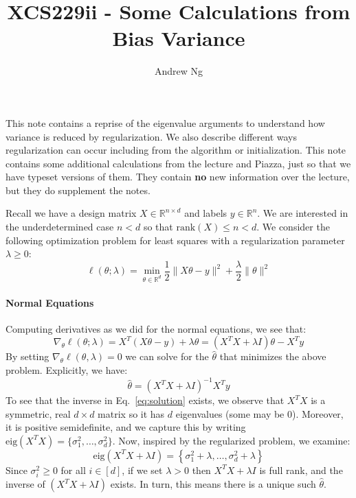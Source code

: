 \documentclass{article}
\newcommand{\R}{\mathbb{R}}
\begin{document}
\title{XCS229ii - Some Calculations from Bias Variance} 
\author{Andrew Ng}
\date{}
\maketitle

\noindent
This note contains a reprise of the eigenvalue arguments to understand
how variance is reduced by regularization. We also
describe different ways regularization can occur including from the
algorithm or initialization. This note contains
some additional calculations from the lecture and Piazza, just so that
we have typeset versions of them. They contain \textbf{no} new
information over the lecture, but they do supplement the notes. 


Recall we have a design matrix $X \in \mathbb{R}^{n \times d}$ and
labels $y \in \R^{n}$. We are interested in the underdetermined case
$n < d$ so that $\mathrm{rank}(X) \leq n < d$. We consider the following
optimization problem for least squares with a regularization parameter
$\lambda \geq 0$:
\[ \ell(\theta; \lambda) = \min_{\theta \in \R^d} \frac{1}{2} \|X\theta - y\|^2 + \frac{\lambda}{2} \|\theta\|^2 \]

\paragraph*{Normal Equations}
Computing derivatives as we did for the normal equations, we see that:
\[ \nabla_{\theta} \ell(\theta;\lambda) = X^T(X\theta - y) + \lambda \theta = (X^TX + \lambda I)\theta - X^Ty  \]
By setting $\nabla_{\theta} \ell(\theta, \lambda) = 0$ we can solve
for the $\hat{\theta}$ that minimizes the above problem. Explicitly, we have:
\begin{equation}
  \hat{\theta} = \left(X^TX + \lambda I\right)^{-1}X^Ty
\label{eq:solution}\end{equation}
\noindent
To see that the inverse in Eq.~\ref{eq:solution} exists, we observe
that $X^TX$ is a symmetric, real $d \times d$ matrix so it has $d$
eigenvalues (some may be $0$). Moreover, it is
positive semidefinite, and we capture this by writing $\mathrm{eig}(X^TX)
= \{\sigma_1^2, \dots, \sigma_d^2\}$. Now, inspired by the regularized
problem, we examine:
\[ \mathrm{eig}(X^TX + \lambda I) = \left\{\sigma_1^2 + \lambda, \dots, \sigma_{d}^2 + \lambda\right\} \]
Since $\sigma_i^2 \geq 0$ for all $i \in [d]$, if we set $\lambda > 0$
then $X^TX + \lambda I$ is full rank, and the inverse of $(X^TX +
\lambda I)$ exists. In turn, this means there is a unique such
$\hat{\theta}$.
\end{document}
